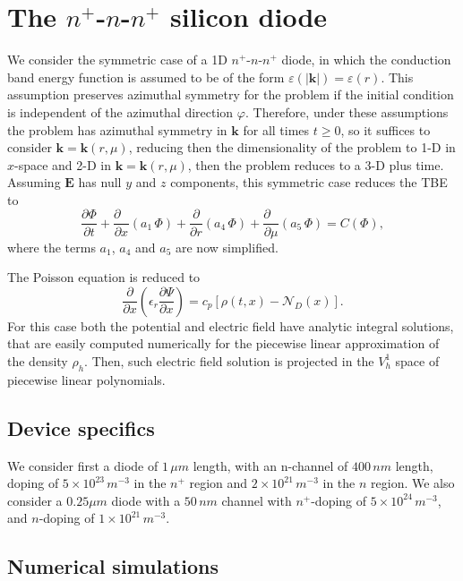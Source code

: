 \documentclass[11pt]{article}
\newcommand{\bk}{\mathbf{k}}
\newcommand{\bE}{\mathbf{E}}
\newcommand{\nV}{\Psi}
\newcommand{\cd}[1]{c_{#1}}
\begin{document}
\section{The $n^{+}$-$n$-$n^{+}$ silicon diode} 
%
%
We consider the symmetric case of a 1D $n^{+}$-$n$-$n^{+}$ diode, 
in which the conduction 
band energy function is assumed to be of the form 
$\varepsilon(|\bk|) = \varepsilon(r)$. 
This assumption preserves azimuthal symmetry for the problem if the initial condition is independent of the azimuthal direction $\varphi$. Therefore, under these assumptions the problem has 
azimuthal symmetry in $\bk$ for all times $t \geq 0$, so it suffices to consider $\bk = \bk(r,\mu)$, 
reducing then the dimensionality of the problem to 1-D in  $x$-space and 2-D in $\bk = \bk(r,\mu)$, then the problem reduces to a 3-D plus time. Assuming $\bE$ has 
null $y$ and $z$ components, 
this  symmetric case reduces the TBE to
%
\begin{equation}
\frac{\partial \Phi}{\partial t} +
\frac{\partial \mbox{ }}{\partial x} \left( a_{1} \, \Phi \right) +
\frac{\partial \mbox{}}{\partial r} \left( a_{4} \, \Phi \right)  + 
\frac{\partial \mbox{ }}{\partial \mu} 
\left( a_{5} \, \Phi \right) 
= C(\Phi),
\end{equation}
%
where the terms $a_{1}$, $a_{4}$ and $a_{5}$ are now simplified.

The Poisson equation is reduced to
%
\begin{equation}
\frac{\partial}{\partial x} \left( \epsilon_{r} \frac{\partial \nV}{\partial x} \right)
  = \cd{p} \left[\rho(t,x) - \mathcal{N}_{D}(x)\right] .
\end{equation}
%
For this case both the potential and electric field
have analytic integral solutions, 
that are easily computed numerically for the piecewise linear approximation of the density 
$\rho_h$. Then, such electric field solution is projected in the $V_h^1$ space of piecewise linear polynomials.
%
\subsection{Device specifics} We consider first a diode of $1 \, \mu m$ length, with an n-channel of $400 \, nm$ length, doping 
of $5 \times 10^{23} \, m^{-3}$ in the $n^+$ region and $2 \times10^{21} \, m^{-3}$ in the $n$ 
region. 
We also consider a $0.25 \mu m$ diode with a $50 \,  nm$ channel with $n^+$-doping of $5\times10^{24} \, m^{-3}$,
and $n$-doping of $1\times10^{21} \, m^{-3}$.
%
%
\subsection{Numerical simulations} 
\end{document}
